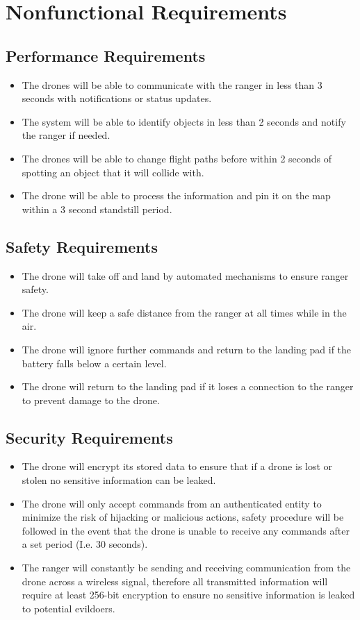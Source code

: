 \chapter{Nonfunctional Requirements}

\section{Performance Requirements}
\begin{itemize}
	\item The drones will be able to communicate with the ranger in less than 3 seconds with notifications or status updates.
	\item The system will be able to identify objects in less than 2 seconds and notify the ranger if needed.
	\item The drones will be able to change flight paths before within 2 seconds of spotting an object that it will collide with.
	\item The drone will be able to process the information and pin it on the map within a 3 second standstill period.
\end{itemize}

\section{Safety Requirements}
\begin{itemize}
	\item The drone will take off and land by automated mechanisms to ensure ranger safety.
	\item The drone will keep a safe distance from the ranger at all times while in the air.
	\item The drone will ignore further commands and return to the landing pad if the battery falls below a certain level.
	\item The drone will return to the landing pad if it loses a connection to the ranger to prevent damage to the drone.
\end{itemize}

\section{Security Requirements}
\begin{itemize}
	\item The drone will encrypt its stored data to ensure that if a drone is lost or stolen no sensitive information can be leaked.
	\item The drone will only accept commands from an authenticated entity to minimize the risk of hijacking or malicious actions, safety procedure will be followed in the event that the drone is unable to receive any commands after a set period (I.e. 30 seconds).
	\item The ranger will constantly be sending and receiving communication from the drone across a wireless signal, therefore all transmitted information will require at least 256-bit encryption to ensure no sensitive information is leaked to potential evildoers.
\end{itemize}

